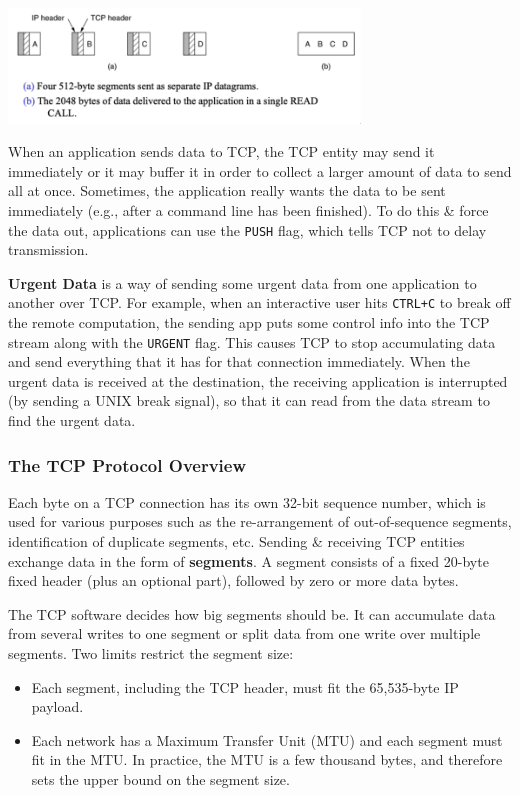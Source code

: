 \documentclass[11pt]{article}
\begin{document}
\begin{center}
    \includegraphics[width=0.7\textwidth]{tcpservicemodel3.png}
\end{center}

When an application sends data to TCP, the TCP entity may send it immediately or it may buffer it in order to collect a larger amount of data to send all at once. 
Sometimes, the application really wants the data to be sent immediately (e.g., after a command line has been finished).
To do this \& force the data out, applications can use the \verb|PUSH| flag, which tells TCP not to delay transmission.

\textbf{Urgent Data} is a way of sending some urgent data from one application to another over TCP.
For example, when an interactive user hits \verb|CTRL+C| to break off the remote computation, the sending app puts some control info into the TCP stream along with the \verb|URGENT| flag.
This causes TCP to stop accumulating data and send everything that it has for that connection immediately.
When the urgent data is received at the destination, the receiving application is interrupted (by sending a UNIX break signal), so that it can read from the data stream to find the urgent data.

\subsubsection{The TCP Protocol Overview}
Each byte on a TCP connection has its own 32-bit sequence number, which is used for various purposes such as the re-arrangement of out-of-sequence segments, identification of duplicate segments, etc.
Sending \& receiving TCP entities exchange data in the form of \textbf{segments}.
A segment consists of a fixed 20-byte fixed header (plus an optional part), followed by zero or more data bytes.

The TCP software decides how big segments should be. 
It can accumulate data from several writes to one segment or split data from one write over multiple segments.
Two limits restrict the segment size:
\begin{itemize}
    \item   Each segment, including the TCP header, must fit the 65,535-byte IP payload.
    \item   Each network has a Maximum Transfer Unit (MTU) and each segment must fit in the MTU. 
            In practice, the MTU is a few thousand bytes, and therefore sets the upper bound on the segment size.
\end{itemize}
\end{document}
